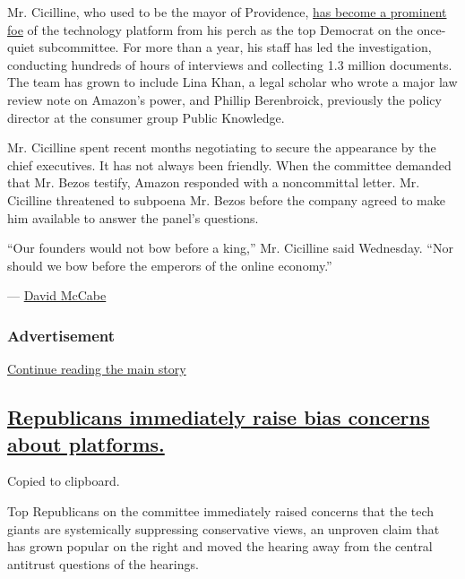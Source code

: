 Mr. Cicilline, who used to be the mayor of Providence,
\href{https://www.nytimes.com/2019/12/08/technology/David-Cicilline-antitrust-tech.html}{has
become a prominent foe} of the technology platform from his perch as the
top Democrat on the once-quiet subcommittee. For more than a year, his
staff has led the investigation, conducting hundreds of hours of
interviews and collecting 1.3 million documents. The team has grown to
include Lina Khan, a legal scholar who wrote a major law review note on
Amazon's power, and Phillip Berenbroick, previously the policy director
at the consumer group Public Knowledge.

Mr. Cicilline spent recent months negotiating to secure the appearance
by the chief executives. It has not always been friendly. When the
committee demanded that Mr. Bezos testify, Amazon responded with a
noncommittal letter. Mr. Cicilline threatened to subpoena Mr. Bezos
before the company agreed to make him available to answer the panel's
questions.

``Our founders would not bow before a king,'' Mr. Cicilline said
Wednesday. ``Nor should we bow before the emperors of the online
economy.''

--- \href{https://www.nytimes.com/by/david-mccabe}{David McCabe}

\hypertarget{advertisement}{%
\subsubsection{Advertisement}\label{advertisement}}

\protect\hyperlink{after-dfp-ad-mid1}{Continue reading the main story}

\hypertarget{republicans-immediately-raise-bias-concerns-about-platforms}{%
\subsection{\texorpdfstring{\protect\hyperlink{republicans-immediately-raise-bias-concerns-about-platforms}{Republicans
immediately raise bias concerns about
platforms.}}{Republicans immediately raise bias concerns about platforms.}}\label{republicans-immediately-raise-bias-concerns-about-platforms}}

Copied to clipboard.

Top Republicans on the committee immediately raised concerns that the
tech giants are systemically suppressing conservative views, an unproven
claim that has grown popular on the right and moved the hearing away
from the central antitrust questions of the hearings.

